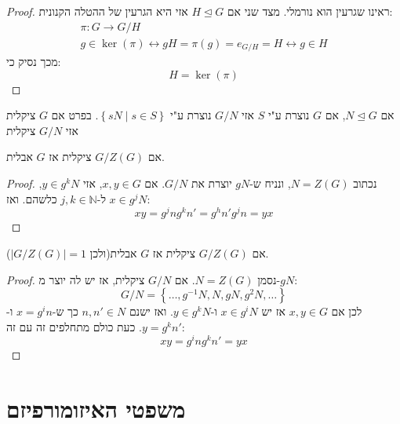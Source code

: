 \documentclass{tstextbook}
\begin{document}
\begin{proof}
ראינו שגרעין הוא נורמלי. מצד שני אם \(H\trianglelefteq G\) אזי
היא הגרעין של ההטלה הקנונית: $$\begin{gathered}\pi:G\to G / H \\g\in \ker\left( \pi \right) \leftrightarrow gH=\pi(g)=e_{G / H}=H \leftrightarrow g\in H
\end{gathered}$$ מכך נסיק כי: $$H=\ker\left( \pi \right)$$

\end{proof}
אם \(N\trianglelefteq G\), אם \(G\) נוצרת ע"י \(S\) אזי \(G / N\) נוצרת ע"י \(\left\{  sN\;|\; s \in S  \right\}\). בפרט אם \(G\) ציקלית אזי \(G / N\) ציקלית

\begin{proposition}
אם \(G / Z(G)\) ציקלית אז \(G\) אבלית.

\end{proposition}
\begin{proof}
נכתוב \(N=Z(G)\), ונניח ש-\(gN\) יוצרת את \(G / N\). אם \(x,y \in G\),
אזי \(y\in g^kN\), \(x \in g^jN\) ל-\(j,k\in \mathbb{N}\) כלשהם. ואז:
$$xy=g^j n g^k n'=g^h n'g^jn=yx$$

\end{proof}
\begin{proposition}
אם \(G/Z(G)\) ציקלית אז \(G\) אבלית(ולכן \(|G/Z(G)|=1\)).

\end{proposition}
\begin{proof}
נסמן \(N=Z(G)\). אם \(G/N\) ציקלית, אז יש לה יוצר מ-\(gN\):
$$G/N=\left\{  \dots,g^{-1} N,N,gN,g^2N, \dots  \right\}$$
לכן אם \(x,y \in G\) אז יש \(x \in g^iN\) ו-\(y\in g^kN\). ואז ישנם \(n,n' \in N\) כך ש-\(x=g^in\) ו-\(y=g^kn'\). כעת כולם מתחלפים זה עם זה: $$xy=g^ing^kn'=yx$$

\end{proof}
\section{משפטי האיזומורפיזם}
\end{document}

